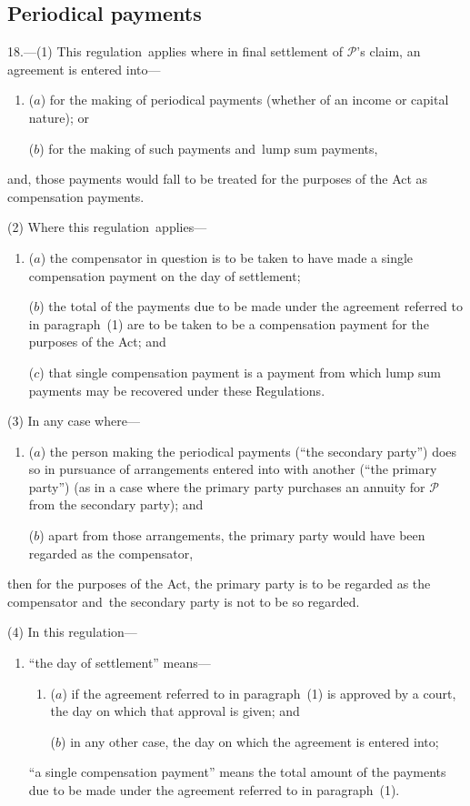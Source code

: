 \documentclass[12pt,a4paper]{article}
\begin{document}
\subsection[18. Periodical payments]{Periodical payments}

18.---(1)  This regulation~applies where in final settlement of $\mathcal{P}$’s claim, an agreement is entered into—
\begin{enumerate}\item[]
($a$) for the making of periodical payments (whether of an income or capital nature); or

($b$) for the making of such payments and~lump sum payments,
\end{enumerate}
and, those payments would fall to be treated for the purposes of the Act as compensation payments.

(2) Where this regulation~applies—
\begin{enumerate}\item[]
($a$) the compensator in question is to be taken to have made a single compensation payment on the day of settlement;

($b$) the total of the payments due to be made under the agreement referred to in paragraph~(1) are to be taken to be a compensation payment for the purposes of the Act; and

($c$) that single compensation payment is a payment from which lump sum payments may be recovered under these Regulations.
\end{enumerate}

(3) In any case where—
\begin{enumerate}\item[]
($a$) the person making the periodical payments (“the secondary party”) does so in pursuance of arrangements entered into with another (“the primary party”) (as in a case where the primary party purchases an annuity for $\mathcal{P}$ from the secondary party); and

($b$) apart from those arrangements, the primary party would have been regarded as the compensator,
\end{enumerate}
then for the purposes of the Act, the primary party is to be regarded as the compensator and~the secondary party is not to be so regarded.

(4) In this regulation—
\begin{enumerate}\item[]
“the day of settlement” means—
\begin{enumerate}\item[]
($a$) 
if the agreement referred to in paragraph~(1) is approved by a court, the day on which that approval is given; and

($b$) 
in any other case, the day on which the agreement is entered into;
\end{enumerate}

“a single compensation payment” means the total amount of the payments due to be made under the agreement referred to in paragraph~(1).
\end{enumerate}
\end{document}
